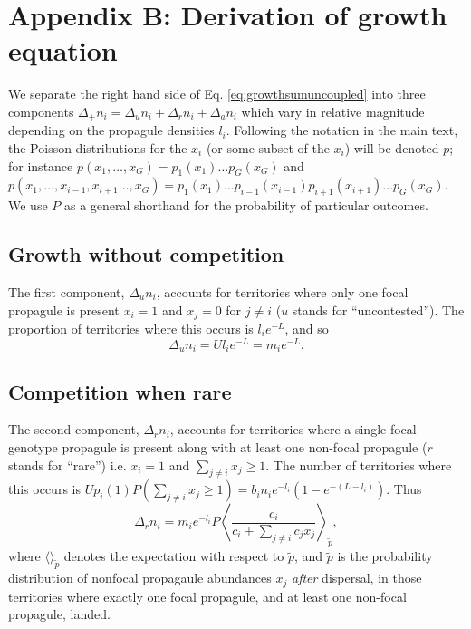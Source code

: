 \documentclass[11pt]{article}
\begin{document}
\section*{Appendix B: Derivation of growth equation}

We separate the right hand side of Eq. \eqref{eq:growthsumuncoupled} into three components $\Delta_+ n_i = \Delta_u n_i+\Delta_r n_i+\Delta_a n_i$ which vary in relative magnitude depending on the propagule densities $l_i$. Following the notation in the main text, the Poisson distributions for the $x_i$ (or some subset of the $x_i$) will be denoted $p$; for instance $p(x_1,\ldots,x_G)=p_1(x_1)\ldots p_G(x_G)$ and $p(x_1,\ldots,x_{i-1},x_{i+1}\ldots,x_G)=p_1(x_1)\ldots p_{i-1}(x_{i-1})p_{i+1}(x_{i+1})\ldots p_G(x_G)$. We use $P$ as a general shorthand for the probability of particular outcomes.

\subsection*{Growth without competition}

The first component, $\Delta_u n_i$, accounts for territories where only one focal propagule is present $x_i=1$ and $x_j=0$ for $j\neq i$ ($u$ stands for ``uncontested''). The proportion of territories where this occurs is $l_i e^{-L}$, and so 
\begin{equation}
\Delta_u n_i=Ul_i e^{-L}=m_i e^{-L}.
\end{equation}

\subsection*{Competition when rare}

The second component, $\Delta_r n_i$, accounts for territories where a single focal genotype propagule is present along with at least one non-focal propagule ($r$ stands for ``rare'') i.e. $x_i=1$ and $\sum_{j\neq i} x_j\geq 1$. The number of territories where this occurs is $Up_i(1)P(\sum_{j\neq i} x_j\geq 1)=b_i n_i e^{-l_i}(1-e^{-(L-l_i)})$. Thus 
\begin{equation}
\Delta_r n_i = m_i e^{-l_i}P\left\langle  \frac{c_i}{c_i +\sum_{j\neq i} c_j x_j } \right\rangle_{\tilde{p}},  \label{eq:deltr}
\end{equation}
where $\langle \rangle_{\tilde{p}}$ denotes the expectation with respect to $\tilde{p}$, and $\tilde{p}$ is the probability distribution of nonfocal propagaule abundances $x_j$ \textit{after} dispersal, in those territories where exactly one focal propagule, and at least one non-focal propagule, landed. 
\end{document}
